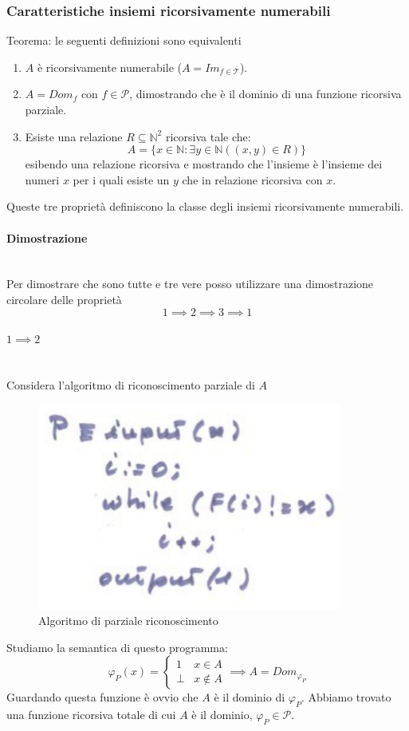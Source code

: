 \documentclass{article}
\begin{document}
\subsubsection{Caratteristiche insiemi ricorsivamente numerabili}
Teorema: le seguenti definizioni sono equivalenti
\begin{enumerate}
    \item $A$ è ricorsivamente numerabile ($A=Im_{f\in\mathcal{T}}$).
    \item $A=Dom_f$ con $f\in\mathcal{P}$, dimostrando che è il dominio di una funzione ricorsiva parziale.
    \item Esiste una relazione $R\subseteq\mathbb{N}^2$ ricorsiva tale che:
          $$A=\{x\in\mathbb{N}:\exists y\in\mathbb{N}((x,y)\in R)\}$$
          esibendo una relazione ricorsiva e mostrando che l'insieme è l'insieme dei numeri $x$ per i quali
          esiste un $y$ che in relazione ricorsiva con $x$.
\end{enumerate}
Queste tre proprietà definiscono la classe degli insiemi ricorsivamente numerabili.
\paragraph{Dimostrazione}\mbox{}\\
Per dimostrare che sono tutte e tre vere posso utilizzare una dimostrazione circolare delle proprietà
$$1\implies 2 \implies 3\implies 1$$

\paragraph{$1\implies 2$}\mbox{}\\
Considera l'algoritmo di riconoscimento parziale di $A$
\begin{figure}[H]
    \centering
    \includegraphics[scale=0.6]{images/prog_ricors_rico.png}
    \caption{Algoritmo di parziale riconoscimento}
\end{figure}
Studiamo la semantica di questo programma:
\[
    \varphi_P(x)=
    \begin{cases}
        1    & x\in A    \\
        \bot & x\notin A
    \end{cases}
    \implies A =Dom_{\varphi_P}
\]
Guardando questa funzione è ovvio che $A$ è il dominio di $\varphi_P$. Abbiamo trovato una funzione
ricorsiva totale di cui $A$ è il dominio, $\varphi_P\in\mathcal{P}$.
\end{document}
